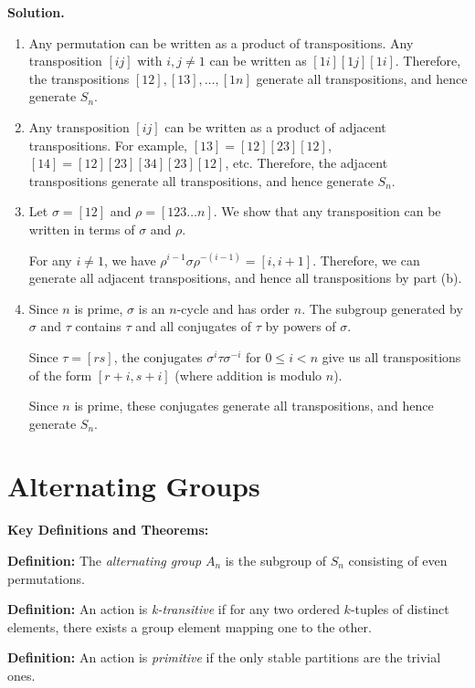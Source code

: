 \noindent\textbf{Solution.}
\begin{enumerate}[label=(\alph*)]
\item Any permutation can be written as a product of transpositions. Any transposition $[ij]$ with $i, j \neq 1$ can be written as $[1i][1j][1i]$. Therefore, the transpositions $[12], [13], \ldots, [1n]$ generate all transpositions, and hence generate $S_n$.

\item Any transposition $[ij]$ can be written as a product of adjacent transpositions. For example, $[13] = [12][23][12]$, $[14] = [12][23][34][23][12]$, etc. Therefore, the adjacent transpositions generate all transpositions, and hence generate $S_n$.

\item Let $\sigma = [12]$ and $\rho = [123 \ldots n]$. We show that any transposition can be written in terms of $\sigma$ and $\rho$.

For any $i \neq 1$, we have $\rho^{i-1}\sigma\rho^{-(i-1)} = [i, i+1]$. Therefore, we can generate all adjacent transpositions, and hence all transpositions by part (b).

\item Since $n$ is prime, $\sigma$ is an $n$-cycle and has order $n$. The subgroup generated by $\sigma$ and $\tau$ contains $\tau$ and all conjugates of $\tau$ by powers of $\sigma$.

Since $\tau = [rs]$, the conjugates $\sigma^i\tau\sigma^{-i}$ for $0 \leq i < n$ give us all transpositions of the form $[r+i, s+i]$ (where addition is modulo $n$).

Since $n$ is prime, these conjugates generate all transpositions, and hence generate $S_n$.
\end{enumerate}

\section{Alternating Groups}

\textbf{Key Definitions and Theorems:}

\textbf{Definition:} The \textit{alternating group} $A_n$ is the subgroup of $S_n$ consisting of even permutations.

\textbf{Definition:} An action is \textit{k-transitive} if for any two ordered $k$-tuples of distinct elements, there exists a group element mapping one to the other.

\textbf{Definition:} An action is \textit{primitive} if the only stable partitions are the trivial ones.

